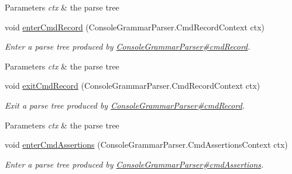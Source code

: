 \begin{DoxyCompactItemize}
\begin{DoxyCompactList}
\begin{DoxyParams}{Parameters}
{\em ctx} & the parse tree\\
\hline
\end{DoxyParams}
 \end{DoxyCompactList}\item 
void \hyperlink{classgov_1_1nasa_1_1jpf_1_1inspector_1_1client_1_1parser_1_1_console_grammar_base_listener_aa4bfae861a3e4bb118169cd5d50b504c}{enter\+Cmd\+Record} (Console\+Grammar\+Parser.\+Cmd\+Record\+Context ctx)
\begin{DoxyCompactList}\small\item\em Enter a parse tree produced by \hyperlink{classgov_1_1nasa_1_1jpf_1_1inspector_1_1client_1_1parser_1_1_console_grammar_parser_a9e1ec461862baeda7056c017c959cd7d}{Console\+Grammar\+Parser\#cmd\+Record}.


\begin{DoxyParams}{Parameters}
{\em ctx} & the parse tree\\
\hline
\end{DoxyParams}
 \end{DoxyCompactList}\item 
void \hyperlink{classgov_1_1nasa_1_1jpf_1_1inspector_1_1client_1_1parser_1_1_console_grammar_base_listener_a4911131de6c98deba68a2e678aec5acd}{exit\+Cmd\+Record} (Console\+Grammar\+Parser.\+Cmd\+Record\+Context ctx)
\begin{DoxyCompactList}\small\item\em Exit a parse tree produced by \hyperlink{classgov_1_1nasa_1_1jpf_1_1inspector_1_1client_1_1parser_1_1_console_grammar_parser_a9e1ec461862baeda7056c017c959cd7d}{Console\+Grammar\+Parser\#cmd\+Record}.


\begin{DoxyParams}{Parameters}
{\em ctx} & the parse tree\\
\hline
\end{DoxyParams}
 \end{DoxyCompactList}\item 
void \hyperlink{classgov_1_1nasa_1_1jpf_1_1inspector_1_1client_1_1parser_1_1_console_grammar_base_listener_ac7491a8f04702e38cec8cea2b8b437aa}{enter\+Cmd\+Assertions} (Console\+Grammar\+Parser.\+Cmd\+Assertions\+Context ctx)
\begin{DoxyCompactList}\small\item\em Enter a parse tree produced by \hyperlink{classgov_1_1nasa_1_1jpf_1_1inspector_1_1client_1_1parser_1_1_console_grammar_parser_aad29008053f0b40d17bf6e3e929b9b11}{Console\+Grammar\+Parser\#cmd\+Assertions}.



\end{DoxyCompactList}
\end{DoxyCompactItemize}
